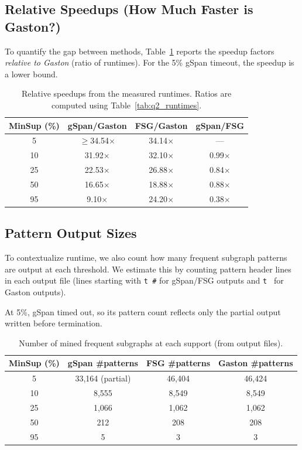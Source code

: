 \documentclass[11pt]{article}
\begin{document}
\subsection{Relative Speedups (How Much Faster is Gaston?)}

To quantify the gap between methods, Table~\ref{tab:q2_speedups} reports the speedup factors
\emph{relative to Gaston} (ratio of runtimes). For the 5\% gSpan timeout, the speedup is a lower bound.

\begin{table}[H]
\centering
\begin{tabular}{|c|c|c|c|}
\hline
\textbf{MinSup (\%)} & \textbf{gSpan/Gaston} & \textbf{FSG/Gaston} & \textbf{gSpan/FSG} \\
\hline
5  & $\ge$34.54$\times$ & 34.14$\times$ & --- \\
\hline
10 & 31.92$\times$ & 32.10$\times$ & 0.99$\times$ \\
\hline
25 & 22.53$\times$ & 26.88$\times$ & 0.84$\times$ \\
\hline
50 & 16.65$\times$ & 18.88$\times$ & 0.88$\times$ \\
\hline
95 & 9.10$\times$ & 24.20$\times$ & 0.38$\times$ \\
\hline
\end{tabular}
\caption{Relative speedups from the measured runtimes. Ratios are computed using Table~\ref{tab:q2_runtimes}.}
\label{tab:q2_speedups}
\end{table}

\subsection{Pattern Output Sizes}

To contextualize runtime, we also count how many frequent subgraph patterns are output at each threshold.
We estimate this by counting pattern header lines in each output file (lines starting with \texttt{t \#} for gSpan/FSG outputs and \texttt{t } for Gaston outputs).

At 5\%, gSpan timed out, so its pattern count reflects only the partial output written before termination.

\begin{table}[H]
\centering
\begin{tabular}{|c|c|c|c|}
\hline
\textbf{MinSup (\%)} & \textbf{gSpan \#patterns} & \textbf{FSG \#patterns} & \textbf{Gaston \#patterns} \\
\hline
5  & 33,164 (partial) & 46,404 & 46,424 \\
\hline
10 & 8,555 & 8,549 & 8,549 \\
\hline
25 & 1,066 & 1,062 & 1,062 \\
\hline
50 & 212 & 208 & 208 \\
\hline
95 & 5 & 3 & 3 \\
\hline
\end{tabular}
\caption{Number of mined frequent subgraphs at each support (from output files).}
\label{tab:q2_pattern_counts}
\end{table}
\end{document}
